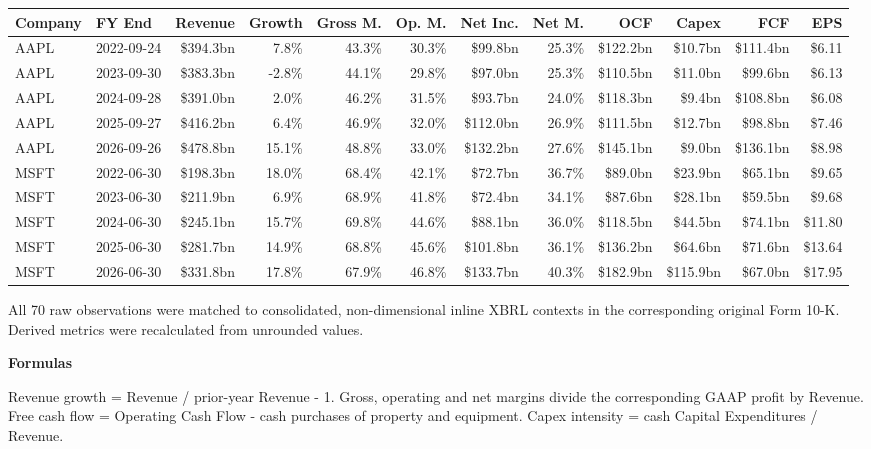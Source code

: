 \documentclass[10pt]{article}
\begin{document}
\fontsize{7.2}{9.2}\selectfont\setlength{\tabcolsep}{1.9pt}\renewcommand{\arraystretch}{1.55}\begin{longtable}{l l r r r r r r r r r r}
\toprule Company & FY End & Revenue & Growth & Gross M. & Op. M. & Net Inc. & Net M. & OCF & Capex & FCF & EPS \\ \midrule\endhead
AAPL & 2022-09-24 & \$394.3bn & 7.8\% & 43.3\% & 30.3\% & \$99.8bn & 25.3\% & \$122.2bn & \$10.7bn & \$111.4bn & \$6.11 \\
AAPL & 2023-09-30 & \$383.3bn & -2.8\% & 44.1\% & 29.8\% & \$97.0bn & 25.3\% & \$110.5bn & \$11.0bn & \$99.6bn & \$6.13 \\
AAPL & 2024-09-28 & \$391.0bn & 2.0\% & 46.2\% & 31.5\% & \$93.7bn & 24.0\% & \$118.3bn & \$9.4bn & \$108.8bn & \$6.08 \\
AAPL & 2025-09-27 & \$416.2bn & 6.4\% & 46.9\% & 32.0\% & \$112.0bn & 26.9\% & \$111.5bn & \$12.7bn & \$98.8bn & \$7.46 \\
AAPL & 2026-09-26 & \$478.8bn & 15.1\% & 48.8\% & 33.0\% & \$132.2bn & 27.6\% & \$145.1bn & \$9.0bn & \$136.1bn & \$8.98 \\
MSFT & 2022-06-30 & \$198.3bn & 18.0\% & 68.4\% & 42.1\% & \$72.7bn & 36.7\% & \$89.0bn & \$23.9bn & \$65.1bn & \$9.65 \\
MSFT & 2023-06-30 & \$211.9bn & 6.9\% & 68.9\% & 41.8\% & \$72.4bn & 34.1\% & \$87.6bn & \$28.1bn & \$59.5bn & \$9.68 \\
MSFT & 2024-06-30 & \$245.1bn & 15.7\% & 69.8\% & 44.6\% & \$88.1bn & 36.0\% & \$118.5bn & \$44.5bn & \$74.1bn & \$11.80 \\
MSFT & 2025-06-30 & \$281.7bn & 14.9\% & 68.8\% & 45.6\% & \$101.8bn & 36.1\% & \$136.2bn & \$64.6bn & \$71.6bn & \$13.64 \\
MSFT & 2026-06-30 & \$331.8bn & 17.8\% & 67.9\% & 46.8\% & \$133.7bn & 40.3\% & \$182.9bn & \$115.9bn & \$67.0bn & \$17.95 \\
\bottomrule\end{longtable}
\newpage
{}All 70 raw observations were matched to consolidated, non-dimensional inline XBRL contexts in the corresponding original Form 10-K. Derived metrics were recalculated from unrounded values.\par\vspace{8pt}\textbf{Formulas}\par Revenue growth = Revenue / prior-year Revenue - 1. Gross, operating and net margins divide the corresponding GAAP profit by Revenue. Free cash flow = Operating Cash Flow - cash purchases of property and equipment. Capex intensity = cash Capital Expenditures / Revenue.
\end{document}
